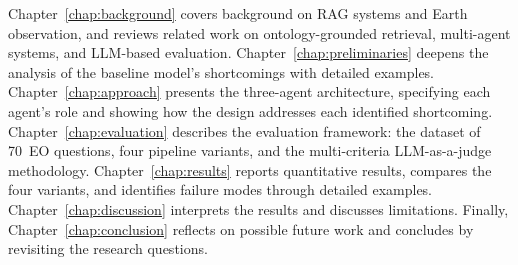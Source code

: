 Chapter~\ref{chap:background} covers background on RAG systems and Earth observation, and reviews related work on ontology-grounded retrieval, multi-agent systems, and LLM-based evaluation. Chapter~\ref{chap:preliminaries} deepens the analysis of the baseline model's shortcomings with detailed examples. Chapter~\ref{chap:approach} presents the three-agent architecture, specifying each agent's role and showing how the design addresses each identified shortcoming. Chapter~\ref{chap:evaluation} describes the evaluation framework: the dataset of 70~EO questions, four pipeline variants, and the multi-criteria LLM-as-a-judge methodology. Chapter~\ref{chap:results} reports quantitative results, compares the four variants, and identifies failure modes through detailed examples. Chapter~\ref{chap:discussion} interprets the results and discusses limitations. Finally, Chapter~\ref{chap:conclusion} reflects on possible future work and concludes by revisiting the research questions.
